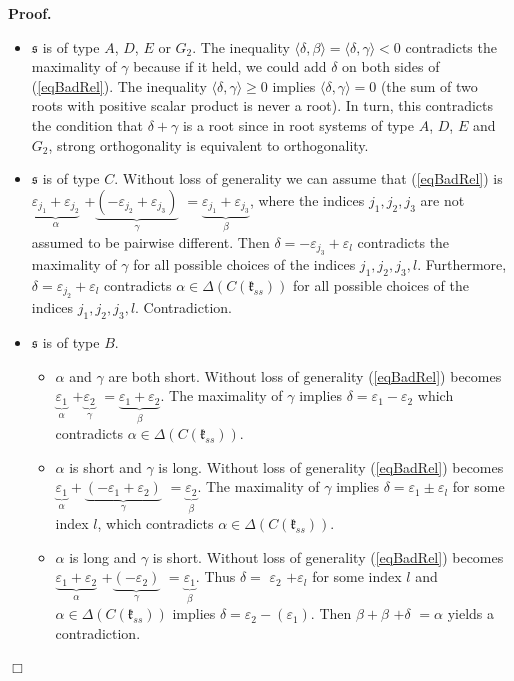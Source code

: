 \documentclass[12pt]{report}
\newenvironment{proof}[1][]{ \textbf{Proof#1. }}{$\Box$\medskip}
\newcommand{\sS}{\mathfrak{s}}
\newcommand{\kk}{\mathfrak{k}}
\newcommand{\refeq}[1]{(\ref{#1})}
\newcommand{\eps}{\varepsilon}
\begin{document}
\begin{proof}
 
\begin{itemize}
\item[Case 1] $\sS$ is of type $A$, $D$, $E$ or $G_2$. The inequality $\langle\delta, \beta\rangle= \langle \delta, \gamma \rangle< 0$ contradicts the maximality of $\gamma$ because if it held, we could add $\delta$ on both sides of \refeq{eqBadRel}. The inequality $\langle\delta, \gamma \rangle \geq 0$ implies $\langle\delta, \gamma \rangle = 0$ (the sum of two roots with positive scalar product is never a root). In turn, this contradicts the condition that $\delta+\gamma$ is a root since in root systems of type $A$, $D$, $E$ and $G_2$, strong orthogonality is equivalent to orthogonality.
\item[Case 2] $\sS$ is of type $C$. Without loss of generality we can assume that \refeq{eqBadRel} is $\underbrace{\eps_{j_1}+ \eps_{j_2}}_{\alpha}$ +$\underbrace{ (-\eps_{j_2} + \eps_{j_3})}_{\gamma}$ $= \underbrace{\eps_{j_1}+  \eps_{j_3}}_{\beta}$, where the indices $j_1, j_2, j_3$ are not assumed to be pairwise different. Then $\delta=-\eps_{j_3}+\eps_l$ contradicts the maximality of $\gamma$ for all possible choices of the indices $j_1, j_2, j_3, l$. Furthermore, $\delta=\eps_{j_2}+ \eps_l$ contradicts $\alpha \in \Delta(C(\kk_{ss}))$ for all possible choices of the indices $j_1, j_2, j_3, l$. Contradiction.
\item[Case 3] $\sS$ is of type $B$. 
\begin{itemize}
\item[Case 3.1] $\alpha$ and $\gamma$ are both short. Without loss of generality \refeq{eqBadRel} becomes $\underbrace{\eps_{1}}_{\alpha}$ $+ \underbrace{\eps_{2}}_{\gamma}$ $= \underbrace{\eps_{1} + \eps_{2}}_{\beta}$. The maximality of $\gamma$ implies $\delta=\eps_{1}-\eps_{2}$ which contradicts $\alpha\in\Delta(C(\kk_{ss}))$.
\item[Case 3.2] $\alpha$ is short and $\gamma$ is long. Without loss of generality \refeq{eqBadRel} becomes $\underbrace{\eps_{1}}_{\alpha} + \underbrace{(-\eps_{1}+\eps_{2})}_{\gamma}$ $= \underbrace{\eps_{2}}_{\beta}$. The maximality of $\gamma$ implies $\delta =\eps_{1} \pm\eps_l$ for some index $l$, which contradicts $\alpha\in\Delta(C(\kk_{ss}))$.
\item[Case 3.3] $\alpha$ is long and $\gamma$ is short. Without loss of generality \refeq{eqBadRel} becomes $\underbrace{\eps_{1}+\eps_{2}}_{\alpha}$ +$\underbrace{(-\eps_{2})}_{\gamma} $ $= \underbrace{ \eps_{1} }_{ \beta} $. Thus $\delta=$ $\eps_{2}$ $+\eps_l$ for some index $l$ and $\alpha \in \Delta( C( \kk_{ ss}))$ implies $\delta=\eps_{2}-(\eps_{1})$. Then $\beta + \beta$ $+\delta$ $=\alpha$ yields a contradiction.

\end{itemize}
\end{itemize}
\end{proof}
\end{document}
